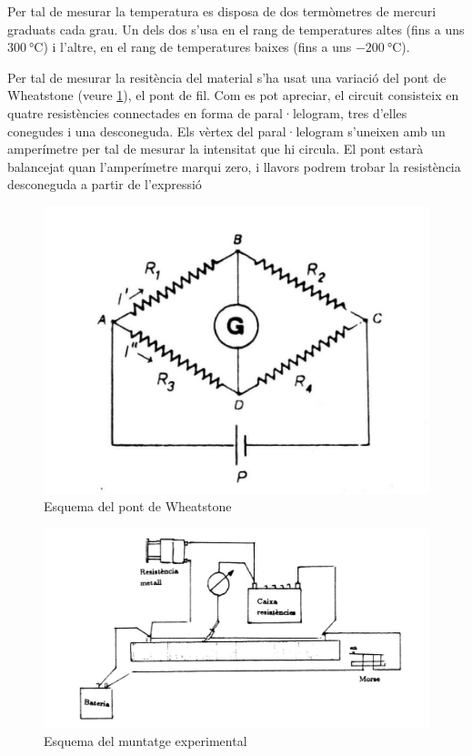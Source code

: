 Per tal de mesurar la temperatura es disposa de dos termòmetres de mercuri graduats cada grau. Un dels dos s'usa en el rang de temperatures altes (fins a uns $\SI{300}{\celsius}$) i l'altre, en el rang de temperatures baixes (fins a uns $ \SI{-200}{\celsius}$).

Per tal de mesurar la resitència del material s'ha usat una variació del pont de Wheatstone (veure \ref{fig: <Wheatstone>}), el pont de fil. Com es pot apreciar, el circuit consisteix en quatre resistències connectades en forma de paral·lelogram, tres d'elles conegudes i una desconeguda. Els vèrtex del paral·lelogram s'uneixen amb un amperímetre per tal de mesurar la intensitat que hi circula. El pont estarà balancejat quan l'amperímetre marqui zero, i llavors podrem trobar la resistència desconeguda a partir de l'expressió
\begin{figure}[h]
	\label{fig: <Wheatstone>}
	\centering
	\includegraphics{pont}
	\caption{Esquema del pont de Wheatstone}
\end{figure}

\begin{figure}[h]
	\label{fig: <muntatge>}
	\centering
	\includegraphics{muntatge}
	\caption{Esquema del muntatge experimental}
\end{figure}

